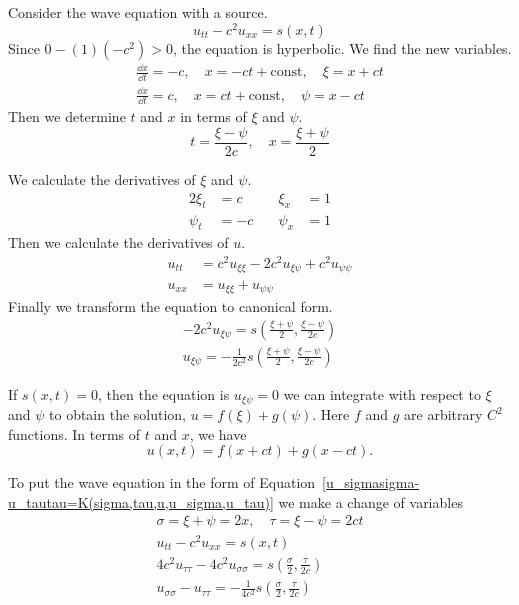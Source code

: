 \begin{Example}
  Consider the wave equation with a source.
  \[
  u_{t t} - c^2 u_{x x} = s(x,t)
  \]
  Since $0 - (1)(-c^2) > 0$, the equation is hyperbolic.
  We find the new variables.
  \begin{gather*}
    \frac{\dd x}{\dd t} = - c, \quad 
    x = - c t + \mathrm{const}, \quad
    \xi = x + c t 
    \\
    \frac{\dd x}{\dd t} = c, \quad 
    x = c t + \mathrm{const}, \quad
    \psi = x - c t
  \end{gather*}
  Then we determine $t$ and $x$ in terms of $\xi$ and $\psi$.
  \[
  t = \frac{\xi - \psi}{2 c}, \quad x = \frac{\xi + \psi}{2}
  \]

  We calculate the derivatives of $\xi$ and $\psi$.
  \begin{alignat*}{2}
    \xi_t &= c &\quad \xi_x &= 1 
    \\
    \psi_t &= - c &\quad \psi_x &= 1 
  \end{alignat*}
  Then we calculate the derivatives of $u$.
  \begin{align*}
    u_{t t} &= c^2 u_{\xi \xi} - 2 c^2 u_{\xi \psi} + c^2 u_{\psi \psi} 
    \\
    u_{x x} &= u_{\xi \xi} + u_{\psi \psi} 
  \end{align*}
  Finally we transform the equation to canonical form.
  \begin{gather*}
    - 2 c^2 u_{\xi \psi} = s \left( \frac{\xi + \psi}{2}, \frac{\xi - \psi}{2 c} \right) 
    \\
    \boxed{
      u_{\xi \psi} = - \frac{1}{2 c^2} s \left( \frac{\xi + \psi}{2}, \frac{\xi - \psi}{2 c} \right)
      }
  \end{gather*}

  If $s(x,t) = 0$, then the equation is $u_{\xi \psi} = 0$ we can
  integrate with respect to $\xi$ and $\psi$ to obtain the 
  solution, $u = f(\xi) + g(\psi)$.  Here $f$ and $g$ are arbitrary
  $C^2$ functions.  In terms of $t$ and $x$, we have
  \[
  \boxed{
    u(x,t) = f(x + c t) + g(x - c t).
    }
  \]

  To put the wave equation in the form of
  Equation~\ref{u_sigmasigma-u_tautau=K(sigma,tau,u,u_sigma,u_tau)}
  we make a change of variables
  \begin{gather*}
    \sigma = \xi + \psi = 2 x, \quad \tau = \xi - \psi = 2 c t
    \\
    u_{t t} - c^2 u_{x x} = s(x,t) 
    \\
    4 c^2 u_{\tau \tau} - 4 c^2 u_{\sigma \sigma} = s \left( \frac{\sigma}{2}, \frac{\tau}{2 c} \right) 
    \\
    \boxed{
      u_{\sigma \sigma} - u_{\tau \tau} = - \frac{1}{4 c^2} s \left( \frac{\sigma}{2}, \frac{\tau}{2 c} \right)
      }
  \end{gather*}
\end{Example}











